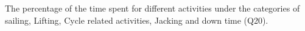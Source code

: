The percentage of the time spent for different activities under the categories of sailing, Lifting, Cycle related activities, Jacking and down time (Q20).